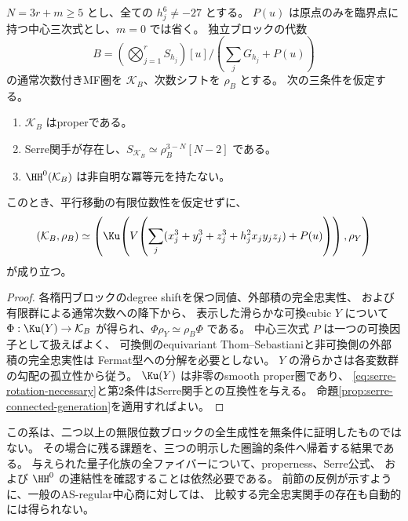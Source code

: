 \begin{corollary}[任意位数の独立ブロックに対する十分条件]
\label{cor:arbitrary-order-conditional-model}
 \(N=3r+m\ge5\) とし、全ての \(h_j^6\ne-27\) とする。
 \(P(u)\) は原点のみを臨界点に持つ中心三次式とし、\(m=0\) では省く。
 独立ブロックの代数
 \[
 B=\left(\bigotimes_{j=1}^rS_{h_j}\right)[u]
     \Big/\left(\sum_jG_{h_j}+P(u)\right)
 \]
 の通常次数付きMF圏を \(\mathcal K_B\)、次数シフトを \(\rho_B\) とする。
 次の三条件を仮定する。
 \begin{enumerate}
 \item \(\mathcal K_B\) はproperである。
 \item Serre関手が存在し、\(S_{\mathcal K_B}\simeq\rho_B^{3-N}[N-2]\) である。
 \item \(\HH^0(\mathcal K_B)\) は非自明な冪等元を持たない。
 \end{enumerate}
 このとき、平行移動の有限位数性を仮定せずに、
 \[
 (\mathcal K_B,\rho_B)\simeq
 \left(\Ku\!\left(V\!\left(\sum_j
 (x_j^3+y_j^3+z_j^3+h_j^2x_jy_jz_j)+P(u)\right)\right),\rho_Y\right)
 \]
 が成り立つ。
\end{corollary}
\begin{proof}
 各楕円ブロックのdegree shiftを保つ同値、外部積の完全忠実性、
 および有限群による通常次数への降下から、
 表示した滑らかな可換cubic \(Y\) について
 \(\Phi:\Ku(Y)\to\mathcal K_B\) が得られ、\(\Phi\rho_Y\simeq\rho_B\Phi\) である。
 中心三次式 \(P\) は一つの可換因子として扱えばよく、
 可換側のequivariant Thom--Sebastianiと非可換側の外部積の完全忠実性は
 Fermat型への分解を必要としない。
 \(Y\) の滑らかさは各変数群の勾配の孤立性から従う。
 \(\Ku(Y)\) は非零のsmooth proper圏であり、
 \eqref{eq:serre-rotation-necessary}と第2条件はSerre関手との互換性を与える。
 命題\ref{prop:serre-connected-generation}を適用すればよい。
\end{proof}

\begin{remark}[十分条件の適用範囲]
 この系は、二つ以上の無限位数ブロックの全生成性を無条件に証明したものではない。
 その場合に残る課題を、三つの明示した圏論的条件へ帰着する結果である。
 与えられた量子化族の全ファイバーについて、properness、Serre公式、
 および \(\HH^0\) の連結性を確認することは依然必要である。
 前節の反例が示すように、一般のAS-regular中心商に対しては、
 比較する完全忠実関手の存在も自動的には得られない。
\end{remark}
